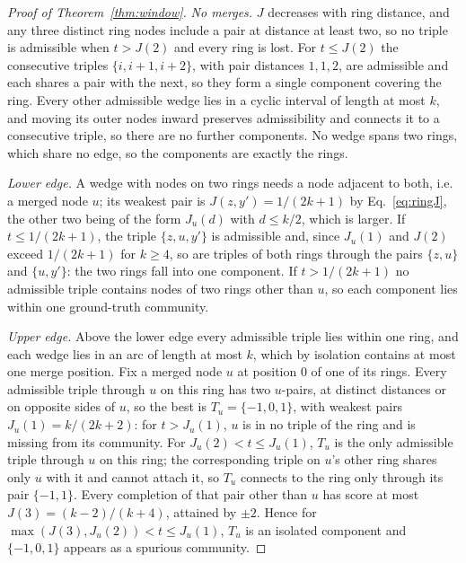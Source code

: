 \begin{proof}[Proof of Theorem~\ref{thm:window}]
\emph{No merges.} $J$ decreases with ring distance, and any three distinct ring nodes
include a pair at distance at least two, so no triple is admissible when $t>J(2)$ and
every ring is lost. For $t\le J(2)$ the consecutive triples $\{i,i{+}1,i{+}2\}$, with
pair distances $1,1,2$, are admissible and each shares a pair with the next, so they
form a single component covering the ring. Every other admissible wedge lies in a
cyclic interval of length at most $k$, and moving its outer nodes inward preserves
admissibility and connects it to a consecutive triple, so there are no further
components. No wedge spans two rings, which share no edge, so the components are
exactly the rings.

\emph{Lower edge.} A wedge with nodes on two rings needs a node adjacent to both, i.e.
a merged node $u$; its weakest pair is $J(z,y')=1/(2k+1)$ by Eq.~\eqref{eq:ringJ}, the
other two being of the form $J_u(d)$ with $d\le k/2$, which is larger. If
$t\le1/(2k+1)$, the triple $\{z,u,y'\}$ is admissible and, since $J_u(1)$ and $J(2)$
exceed $1/(2k+1)$ for $k\ge4$, so are triples of both rings through the pairs
$\{z,u\}$ and $\{u,y'\}$: the two rings fall into one component. If $t>1/(2k+1)$ no
admissible triple contains nodes of two rings other than $u$, so each component lies
within one ground-truth community.

\emph{Upper edge.} Above the lower edge every admissible triple lies within one ring,
and each wedge lies in an arc of length at most $k$, which by isolation contains at
most one merge position. Fix a merged node $u$ at position $0$ of one of its rings.
Every admissible triple through $u$ on this ring has two $u$-pairs, at distinct
distances or on opposite sides of $u$, so the best is $T_u=\{-1,0,1\}$, with weakest
pairs $J_u(1)=k/(2k+2)$: for $t>J_u(1)$, $u$ is in no triple of the ring and is missing
from its community. For $J_u(2)<t\le J_u(1)$, $T_u$ is the only admissible triple through
$u$ on this ring; the corresponding triple on $u$'s other ring shares only $u$ with it
and cannot attach it, so $T_u$ connects to the ring only through its pair $\{-1,1\}$.
Every completion of that pair other than $u$ has score at most $J(3)=(k-2)/(k+4)$,
attained by $\pm2$. Hence for $\max(J(3),J_u(2))<t\le J_u(1)$, $T_u$ is an isolated
component and $\{-1,0,1\}$ appears as a spurious community.


\end{proof}
